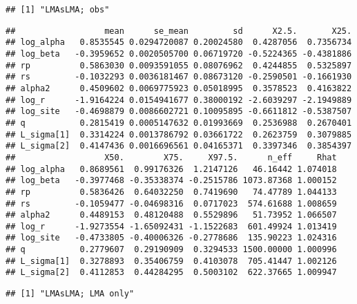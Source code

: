 \documentclass[12pt,]{article}
\begin{document}
\begin{verbatim}
## [1] "LMAsLMA; obs"
\end{verbatim}

\begin{verbatim}
##                  mean      se_mean         sd      X2.5.       X25.
## log_alpha   0.8535545 0.0294720087 0.20024580  0.4287056  0.7356734
## log_beta   -0.3959652 0.0020505700 0.06719720 -0.5224365 -0.4381886
## rp          0.5863030 0.0093591055 0.08076962  0.4244855  0.5325897
## rs         -0.1032293 0.0036181467 0.08673120 -0.2590501 -0.1661930
## alpha2      0.4509602 0.0069775923 0.05018995  0.3578523  0.4163822
## log_r      -1.9164224 0.0154941677 0.38000192 -2.6039297 -2.1949889
## log_site   -0.4698879 0.0086602721 0.10095895 -0.6611812 -0.5387507
## q           0.2815419 0.0005147632 0.01993669  0.2536988  0.2670401
## L_sigma[1]  0.3314224 0.0013786792 0.03661722  0.2623759  0.3079885
## L_sigma[2]  0.4147436 0.0016696561 0.04165371  0.3397346  0.3854397
##                  X50.        X75.     X97.5.      n_eff     Rhat
## log_alpha   0.8689561  0.99176326  1.2147126   46.16442 1.074018
## log_beta   -0.3977468 -0.35338374 -0.2515786 1073.87368 1.000152
## rp          0.5836426  0.64032250  0.7419690   74.47789 1.044133
## rs         -0.1059477 -0.04698316  0.0717023  574.61688 1.008659
## alpha2      0.4489153  0.48120488  0.5529896   51.73952 1.066507
## log_r      -1.9273554 -1.65092431 -1.1522683  601.49924 1.013419
## log_site   -0.4733805 -0.40006326 -0.2778686  135.90223 1.024316
## q           0.2779607  0.29190909  0.3294533 1500.00000 1.000996
## L_sigma[1]  0.3278893  0.35406759  0.4103078  705.41447 1.002126
## L_sigma[2]  0.4112853  0.44284295  0.5003102  622.37665 1.009947
\end{verbatim}

\begin{verbatim}
## [1] "LMAsLMA; LMA only"
\end{verbatim}
\end{document}
